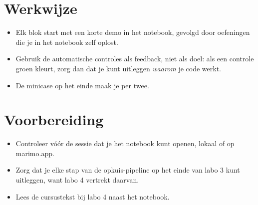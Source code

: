 \documentclass[11pt,a4paper]{article}
\begin{document}
\section{Werkwijze}

\begin{itemize}
  \item Elk blok start met een korte demo in het notebook, gevolgd door
        oefeningen die je in het notebook zelf oplost.
  \item Gebruik de automatische controles als feedback, niet als doel:
        als een controle groen kleurt, zorg dan dat je kunt uitleggen
        \emph{waarom} je code werkt.
  \item De minicase op het einde maak je per twee.
\end{itemize}

\section{Voorbereiding}

\begin{itemize}
  \item Controleer vóór de sessie dat je het notebook kunt openen,
        lokaal of op marimo.app.
  \item Zorg dat je elke stap van de opkuis-pipeline op het einde van
        labo 3 kunt uitleggen, want labo 4 vertrekt daarvan.
  \item Lees de cursustekst bij labo 4 naast het notebook.
\end{itemize}
\end{document}

